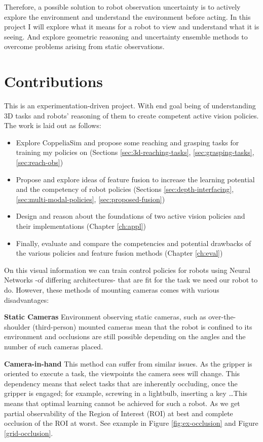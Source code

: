   Therefore, a possible solution to robot observation uncertainty is to actively explore the environment and understand the environment before acting. In this project I will explore what it means for a robot to view and understand what it is seeing. And explore geometric reasoning and uncertainty ensemble methods to overcome problems arising from static observations.


\section{Contributions}
  This is an experimentation-driven project. With end goal being of understanding 3D tasks and robots' reasoning of them to create competent active vision policies. The work is laid out as follows:

  \begin{itemize}
    \item Explore CoppeliaSim and propose some reaching and grasping tasks for training my policies on (Sections \ref{sec:3d-reaching-tasks}, \ref{sec:grasping-tasks}, \ref{sec:reach-obs})
    \item Propose and explore ideas of feature fusion to increase the learning potential and the competency of robot policies (Sections \ref{sec:depth-interfacing}, \ref{sec:multi-modal-policies}, \ref{sec:proposed-fusion})
    \item Design and reason about the foundations of two active vision policies and their implementations (Chapter \ref{ch:appl})
    \item Finally, evaluate and compare the competencies and potential drawbacks of the various policies and feature fusion methods (Chapter \ref{ch:eval})
  \end{itemize}


  On this visual information we can train control policies for robots using Neural Networks \cite{spyros1995nnStateOfTheArt, Schmidhuber2015nn} -of differing architectures- that are fit for the task we need our robot to do. However, these methods of mounting cameras comes with various disadvantages:
  
  \textbf{Static Cameras} Environment observing static cameras, such as over-the-shoulder (third-person) mounted cameras mean that the robot is confined to its environment and occlusions are still possible depending on the angles and the number of such cameras placed.
    
  \textbf{Camera-in-hand} This method can suffer from similar issues. As the gripper is oriented to execute a task, the viewpoints the camera sees will change. This dependency means that select tasks that are inherently occluding, once the gripper is engaged; for example, screwing in a lightbulb, inserting a key \ldots This means that optimal learning cannot be achieved for such a robot. As we get partial observability of the Region of Interest (ROI) at best and complete occlusion of the ROI at worst. See example in Figure \ref{fig:ex-occlusion} and Figure \ref{grid-occlusion}.

